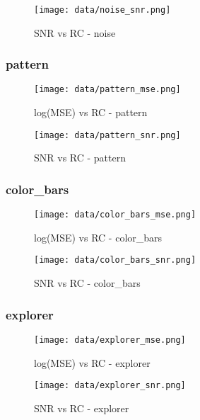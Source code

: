 \documentclass[12pt,a4paper]{article}
\begin{document}
\begin{figure}[H]
    \centering
    \texttt{[image: data/noise\_snr.png]}
    \caption{SNR vs RC - noise}
    
\end{figure}

\subsubsection{pattern}
\begin{figure}[H]
    \centering
    \texttt{[image: data/pattern\_mse.png]}
    \caption{log(MSE) vs RC - pattern}
    
\end{figure}

\begin{figure}[H]
    \centering
    \texttt{[image: data/pattern\_snr.png]}
    \caption{SNR vs RC - pattern}
    
\end{figure}

\subsubsection{color\_bars}
\begin{figure}[H]
    \centering
    \texttt{[image: data/color\_bars\_mse.png]}
    \caption{log(MSE) vs RC - color\_bars}
    
\end{figure}

\begin{figure}[H]
    \centering
    \texttt{[image: data/color\_bars\_snr.png]}
    \caption{SNR vs RC - color\_bars}
    
\end{figure}

\subsubsection{explorer}
\begin{figure}[H]
    \centering
    \texttt{[image: data/explorer\_mse.png]}
    \caption{log(MSE) vs RC - explorer}
    
\end{figure}

\begin{figure}[H]
    \centering
    \texttt{[image: data/explorer\_snr.png]}
    \caption{SNR vs RC - explorer}
    
\end{figure}
\end{document}
